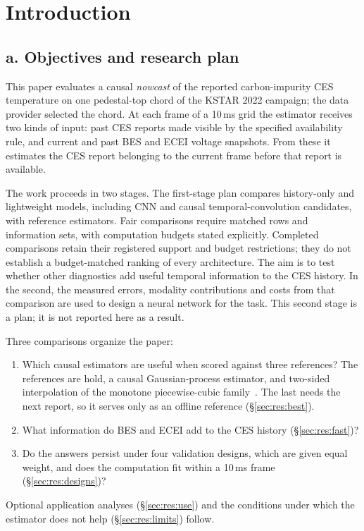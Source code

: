 \section{Introduction}
\label{sec:intro}

\subsection*{a. Objectives and research plan}
This paper evaluates a causal \emph{nowcast} of the reported carbon-impurity CES temperature on one pedestal-top chord of the KSTAR 2022 campaign; the data provider selected the chord. At each frame of a 10\,ms grid the estimator receives two kinds of input: past CES reports made visible by the specified availability rule, and current and past BES and ECEI voltage snapshots. From these it estimates the CES report belonging to the current frame before that report is available.

The work proceeds in two stages. The first-stage plan compares history-only and lightweight models, including CNN and causal temporal-convolution candidates, with reference estimators. Fair comparisons require matched rows and information sets, with computation budgets stated explicitly. Completed comparisons retain their registered support and budget restrictions; they do not establish a budget-matched ranking of every architecture. The aim is to test whether other diagnostics add useful temporal information to the CES history. In the second, the measured errors, modality contributions and costs from that comparison are used to design a neural network for the task. This second stage is a plan; it is not reported here as a result.

Three comparisons organize the paper:
\begin{enumerate}\setlength{\itemsep}{1pt}\setlength{\parskip}{0pt}
\item Which causal estimators are useful when scored against three references? The references are hold, a causal Gaussian-process estimator, and two-sided interpolation of the monotone piecewise-cubic family~\citep{fritsch1980}. The last needs the next report, so it serves only as an offline reference (\S\ref{sec:res:best}).
\item What information do BES and ECEI add to the CES history (\S\ref{sec:res:fast})?
\item Do the answers persist under four validation designs, which are given equal weight, and does the computation fit within a 10\,ms frame (\S\ref{sec:res:designs})?
\end{enumerate}
Optional application analyses (\S\ref{sec:res:use}) and the conditions under which the estimator does not help (\S\ref{sec:res:limits}) follow.

